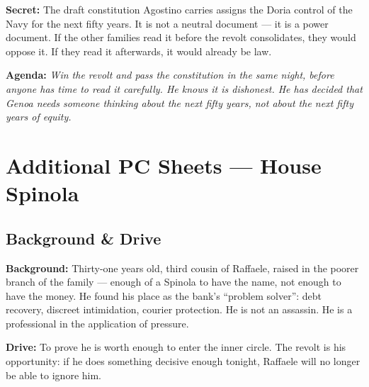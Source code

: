 \clearpage
\begin{secretbox}
\textbf{Secret:} The draft constitution Agostino carries assigns the Doria control of
the Navy for the next fifty years. It is not a neutral document --- it is a power
document. If the other families read it before the revolt consolidates, they would
oppose it. If they read it afterwards, it would already be law.

\medskip\noindent\textcolor{SecretRed}{\textbf{Agenda:}}
\textit{Win the revolt and pass the constitution in the same night, before anyone has
time to read it carefully. He knows it is dishonest. He has decided that Genoa needs
someone thinking about the next fifty years, not about the next fifty years of equity.}
\end{secretbox}

\clearpage


\chapter{Additional PC Sheets --- House Spinola}


\section*{Background \& Drive}
\begin{rulebox}{}
\textbf{Background:} Thirty-one years old, third cousin of Raffaele, raised in the
poorer branch of the family --- enough of a Spinola to have the name, not enough to
have the money. He found his place as the bank's ``problem solver'': debt recovery,
discreet intimidation, courier protection. He is not an assassin. He is a professional
in the application of pressure.

\medskip\noindent\textcolor{SpinolaRed}{\textbf{Drive:}} To prove he is worth
enough to enter the inner circle. The revolt is his opportunity: if he does something
decisive enough tonight, Raffaele will no longer be able to ignore him.
\end{rulebox}

